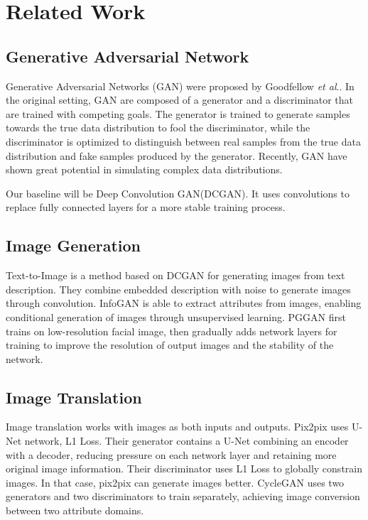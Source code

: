 \section{Related Work}


\subsection{Generative Adversarial Network}

Generative Adversarial Networks (GAN) were proposed by Goodfellow \emph{et al}..
In the original setting, GAN are composed of a generator and a discriminator that are trained with competing goals.
The generator is trained to generate samples towards the true data distribution to fool the discriminator,
    while the discriminator is optimized to distinguish between real samples
    from the true data distribution and fake samples produced by the generator.
Recently, GAN have shown great potential in simulating complex data distributions.



Our baseline will be Deep Convolution GAN(DCGAN).
It uses convolutions to replace fully connected layers for a more stable training process.




\subsection{Image Generation}

Text-to-Image is a method based on DCGAN for generating images from text description.
They combine embedded description with noise to generate images through convolution.
InfoGAN is able to extract attributes from images,
    enabling conditional generation of images through unsupervised learning.
PGGAN first trains on low-resolution facial image,
    then gradually adds network layers for training to improve the resolution of output images and the stability of the network.

\subsection{Image Translation}
Image translation works with images as both inputs and outputs.
Pix2pix uses U-Net network, L1 Loss.
Their generator contains a U-Net combining an encoder with a decoder,
    reducing pressure on each network layer and retaining more original image information.
Their discriminator uses L1 Loss to globally constrain images.
In that case, pix2pix can generate images better.
CycleGAN uses two generators and two discriminators to train separately, achieving image conversion between two attribute domains.

